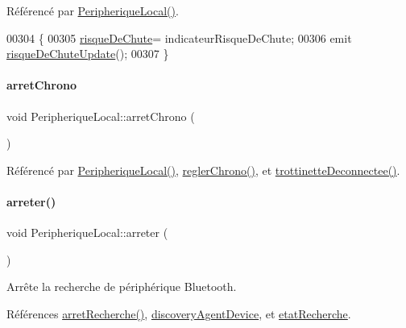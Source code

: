 Référencé par \hyperlink{class_peripherique_local_a99a652b8659a3692f164cf1a0382e4bf}{Peripherique\+Local()}.


\begin{DoxyCode}
00304 \{
00305     \hyperlink{class_peripherique_local_a79a43778c2db1c9c70784b6329dc383e}{risqueDeChute}= indicateurRisqueDeChute;
00306     emit \hyperlink{class_peripherique_local_a4c2e32ed7feda45c6347144a99be7525}{risqueDeChuteUpdate}();
00307 \}
\end{DoxyCode}
\mbox{\label{class_peripherique_local_a150599c1ded2462eb0e2d1d943459a34}} 
\paragraph{\texorpdfstring{arret\+Chrono}{arretChrono}}
{\footnotesize\ttfamily void Peripherique\+Local\+::arret\+Chrono (\begin{DoxyParamCaption}{ }\end{DoxyParamCaption})\hspace{0.3cm}{\ttfamily [signal]}}



Référencé par \hyperlink{class_peripherique_local_a99a652b8659a3692f164cf1a0382e4bf}{Peripherique\+Local()}, \hyperlink{class_peripherique_local_ae4f8521445a9dc3a51ff116e1f6597d7}{regler\+Chrono()}, et \hyperlink{class_peripherique_local_ab081485bf0f9403d9e7fc5f0407cdc5c}{trottinette\+Deconnectee()}.

\mbox{\label{class_peripherique_local_afbbb6d37b616cc4579486c3b1ce700b2}} 
\paragraph{\texorpdfstring{arreter()}{arreter()}}
{\footnotesize\ttfamily void Peripherique\+Local\+::arreter (\begin{DoxyParamCaption}{ }\end{DoxyParamCaption})}

Arrête la recherche de périphérique Bluetooth. 

Références \hyperlink{class_peripherique_local_a05dad5bf82b579731591407a0c098957}{arret\+Recherche()}, \hyperlink{class_peripherique_local_a9e398b7dd89a20b1bee67b8c3467da69}{discovery\+Agent\+Device}, et \hyperlink{class_peripherique_local_a6638c29f6f75c3b4d329d93ae6ea4a48}{etat\+Recherche}.




